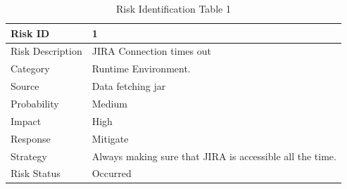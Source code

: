 \documentclass[oneside,a4paper,12pt]{book}
\begin{document}
\begingroup
\setlength{\tabcolsep}{5pt} %
\renewcommand{\arraystretch}{1.5} %

\begin{table}[H]
 			\centering
\begin{tabular}{p{1.31in}p{3.71in}}
\hline
\multicolumn{1}{|p{1.31in}}{Risk ID} & 
\multicolumn{1}{|p{3.71in}|}{1} \\
\hline
\multicolumn{1}{|p{1.31in}}{Risk Description} & 
\multicolumn{1}{|p{3.71in}|}{JIRA Connection times out} \\
\hline
\multicolumn{1}{|p{1.31in}}{Category} & 
\multicolumn{1}{|p{3.71in}|}{Runtime Environment.} \\
\hline
\multicolumn{1}{|p{1.31in}}{Source} & 
\multicolumn{1}{|p{3.71in}|}{Data fetching jar} \\
\hline
\multicolumn{1}{|p{1.31in}}{Probability} & 
\multicolumn{1}{|p{3.71in}|}{Medium} \\
\hline
\multicolumn{1}{|p{1.31in}}{Impact} & 
\multicolumn{1}{|p{3.71in}|}{High} \\
\hline
\multicolumn{1}{|p{1.31in}}{Response} & 
\multicolumn{1}{|p{3.71in}|}{Mitigate} \\
\hline
\multicolumn{1}{|p{1.31in}}{Strategy} & 
\multicolumn{1}{|p{3.71in}|}{Always making sure that JIRA is accessible all the time.} \\
\hline
\multicolumn{1}{|p{1.31in}}{Risk Status} & 
\multicolumn{1}{|p{3.71in}|}{Occurred} \\
\hline

\end{tabular}
\caption{Risk Identification Table 1 }
\label{tab:Risk Identification Table 1 }

 \end{table}
\endgroup 
 
 \begingroup
\setlength{\tabcolsep}{5pt} %
\renewcommand{\arraystretch}{1.5} %
 
\end{document}
